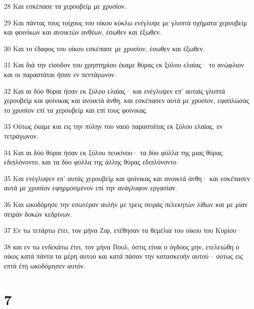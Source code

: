 \par 28 Και εσκέπασε τα χερουβείμ με χρυσίον.
\par 29 Και πάντας τους τοίχους του οίκου κύκλω ενέγλυψε με γλυπτά σχήματα χερουβείμ και φοινίκων και ανοικτών ανθέων, έσωθεν και έξωθεν.
\par 30 Και το έδαφος του οίκου εσκέπασε με χρυσίον, έσωθεν και έξωθεν.
\par 31 Και διά την είσοδον του χρηστηρίου έκαμε θύρας εκ ξύλου ελαίας· το ανώφλιον και οι παραστάται ήσαν εν πεντάγωνον.
\par 32 Και αι δύο θύραι ήσαν εκ ξύλου ελαίας· και ενέγλυψεν επ' αυταίς γλυπτά χερουβείμ και φοίνικας και ανοικτά άνθη, και εσκέπασεν αυτά με χρυσίον, εφαπλώσας το χρυσίον επί τα χερουβείμ και επί τους φοίνικας.
\par 33 Ούτως έκαμε και εις την πύλην του ναού παραστάτας εκ ξύλου ελαίας, εν τετράγωνον.
\par 34 Και αι δύο θύραι ήσαν εκ ξύλου πευκίνου· τα δύο φύλλα της μιας θύρας εδιπλόνοντο, και τα δύο φύλλα της άλλης θύρας εδιπλόνοντο.
\par 35 Και ενέγλυψεν επ' αυτάς χερουβείμ και φοίνικας και ανοικτά άνθη· και εσκέπασεν αυτά με χρυσίον εφηρμοσμένον επί την ανάγλυφον εργασίαν.
\par 36 Και ωκοδόμησε την εσωτέραν αυλήν με τρεις σειράς πελεκητών λίθων και με μίαν σειράν δοκών κεδρίνων.
\par 37 Εν τω τετάρτω έτει, τον μήνα Ζιφ, ετέθησαν τα θεμέλια του οίκου του Κυρίου·
\par 38 και εν τω ενδεκάτω έτει, τον μήνα Βουλ, όστις είναι ο όγδοος μην, ετελειώθη ο οίκος κατά πάντα τα μέρη αυτού και κατά πάσαν την κατασκευήν αυτού· ούτως εις επτά έτη ωκοδόμησεν αυτόν.

\chapter{7}

